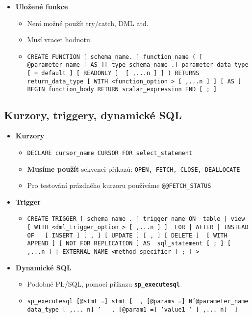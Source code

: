 \begin{itemize}
    \item \textbf{Uložené funkce}
          \begin{itemize}
              \item Není možné použít try/catch, DML atd.
              \item Musí vracet hodnotu.
              \item \texttt{CREATE FUNCTION [ schema\_name. ] function\_name ( [ { @parameter\_name [ AS ][ type\_schema\_name .] parameter\_data\_type [ = default ] [ READONLY ] } [ ,...n ] ] ) RETURNS return\_data\_type [ WITH <function\_option > [ ,...n ] ] [ AS ] BEGIN function\_body RETURN scalar\_expression END [ ; ]}
          \end{itemize}
\end{itemize}



\subsection{Kurzory, triggery, dynamické SQL}
\begin{itemize}
    \item \textbf{Kurzory}
          \begin{itemize}
              \item \texttt{DECLARE cursor\_name CURSOR FOR select\_statement }
              \item \textbf{Musíme použít} sekvenci příkazů: \texttt{OPEN, FETCH, CLOSE, DEALLOCATE }
              \item Pro testování prázdného kurzoru používáme \texttt{@@FETCH\_STATUS}
          \end{itemize}

    \item \textbf{Trigger}
          \begin{itemize}
              \item \texttt{CREATE TRIGGER [ schema\_name . ] trigger\_name ON { table | view } [ WITH <dml\_trigger\_option > [ ,...n ] ] { FOR | AFTER | INSTEAD OF } { [ INSERT ] [ , ] [ UPDATE ] [ , ] [ DELETE ] } [ WITH APPEND ] [ NOT FOR REPLICATION ] AS { sql\_statement [ ; ] [ ,...n ] | EXTERNAL NAME <method specifier [ ; ] > }}
          \end{itemize}

    \item \textbf{Dynamické SQL}
          \begin{itemize}
              \item Podobné PL/SQL, pomocí příkazu \textbf{\texttt{sp\_executesql}}
              \item \texttt{sp\_executesql [@stmt =] stmt [ { , [@params =] N’@parameter\_name data\_type [ ,... n] ’ } { , [@param1 =] ’value1 ’ [ ,... n] } ]}
          \end{itemize}
\end{itemize}



